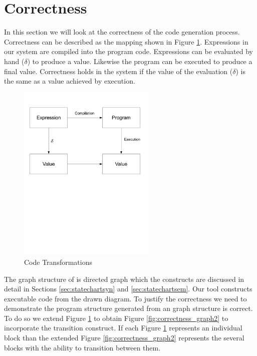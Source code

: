 \section{Correctness}

In this section we will look at the correctness of the code generation process. 
Correctness can be described as the mapping shown in Figure \ref{fig:correctness_graph1}. 
Expressions in our system are compiled into the program code. 
Expressions can be evaluated by hand ($\delta$) to produce a value. 
Likewise the program can be executed to produce a final value. 
Correctness holds in the system if the value of the evaluation ($\delta$) is the 
same as a value achieved by execution.

\begin{figure}[htb]
    \centering
    \includegraphics[trim= 10mm 120mm 10mm 10mm, clip, width=250px]{./images/correctness_graph1.pdf}
    \caption{Code Transformations}
    \label{fig:correctness_graph1}
\end{figure}

The graph structure of \plccharts is directed graph which 
the constructs are discussed in detail in Sections \ref{sec:statechartsyn} and \ref{sec:statechartsem}. 
Our tool constructs executable code from the drawn diagram.  To justify the correctness we need 
to demonstrate the program structure generated from an graph structure is correct. 
To do so we extend Figure \ref{fig:correctness_graph1} to obtain 
Figure \ref{fig:correctness_graph2} to incorporate the transition construct. 
If each Figure \ref{fig:correctness_graph1} represents an individual block 
than the extended Figure \ref{fig:correctness_graph2} represents the several 
blocks with the ability to transition between them.

